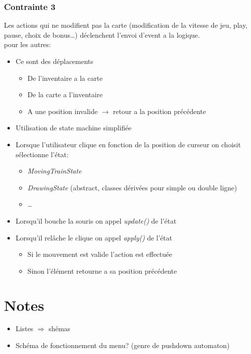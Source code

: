 \documentclass[report, backcover, french, nodocumentinfo]{upmethodology-document}
\begin{document}
				\subsubsection{Contrainte 3}
					Les actions qui ne modifient pas la carte (modification de la vitesse de jeu, play, pause, choix de bonus\ldots) déclenchent l'envoi d'event a la logique.\\
					pour les autres:
					\begin{itemize}
						\item Ce sont des déplacements
							\begin{itemize}
								\item De l'inventaire a la carte
								\item De la carte a l'inventaire
								\item A une position invalide $\rightarrow$ retour a la position précédente
							\end{itemize}
						\item Utilisation de state machine simplifiée
						\item Lorsque l'utilisateur clique en fonction de la position de curseur on choisit sélectionne l'état:
							\begin{itemize}
								\item \textit{MovingTrainState}
								\item \textit{DrawingState} (abstract, classes dérivées pour simple ou double ligne)
								\item \ldots
							\end{itemize}
						\item Lorsqu’il bouche la souris on appel \textit{update()} de l'état
						\item Lorsqu'il relâche le clique on appel \textit{apply()} de l'état
							\begin{itemize}
								\item Si le mouvement est valide l'action est effectuée
								\item Sinon l'élément retourne a sa position précédente
							\end{itemize}
					\end{itemize}
		\section{Notes}
			\begin{itemize}
				\item Listes $\Longrightarrow$ shémas
				\item Schéma de fonctionnement du menu? (genre de pushdown automaton)
			\end{itemize}
\end{document}

